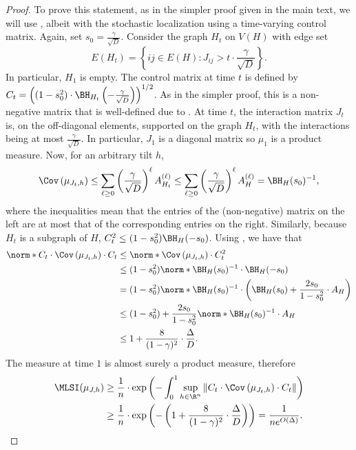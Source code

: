 \documentclass[11pt,letterpaper]{article}
\begin{document}
\begin{proof}
    To prove this statement, as in the simpler proof given in the main text, we will use , albeit with the stochastic localization using a time-varying control matrix. Again, set $s_0 = \frac{\gamma}{\sqrt{D}}$. Consider the graph $H_t$ on $V(H)$ with edge set
    \[ E(H_t) = \left\{ ij \in E(H) : J_{ij} > t \cdot  \frac{\gamma}{\sqrt{D}} \right\}. \]
    In particular, $H_1$ is empty.
    The control matrix at time $t$ is defined by $C_t = \left((1-s_0^2) \cdot \BH_{H_t} \left( - \frac{\gamma}{\sqrt{D}} \right)\right)^{1/2}$. As in the simpler proof, this is a non-negative matrix that is well-defined due to . At time $t$, the interaction matrix $J_t$ is, on the off-diagonal elements, supported on the graph $H_t$, with the interactions being at most $\frac{\gamma}{\sqrt{D}}$. In particular, $J_1$ is a diagonal matrix so $\mu_{1}$ is a product measure. Now, for an arbitrary tilt $h$,
    \[ \Cov\left( \mu_{J_t,h} \right) \le \sum_{\ell \ge 0} \left( \frac{\gamma}{\sqrt{D}} \right)^{\ell} A^{(\ell)}_{H_t} \le \sum_{\ell \ge 0} \left( \frac{\gamma}{\sqrt{D}} \right)^{\ell} A^{(\ell)}_{H} = \BH_{H}(s_0)^{-1}, \]
    where the inequalities mean that the entries of the (non-negative) matrix on the left are at most that of the corresponding entries on the right. Similarly, because $H_t$ is a subgraph of $H$, $C_t^2 \le (1-s_0^2) \BH_H(-s_0)$. Using , we have that
    \begin{align*}
        \norm*{ C_t \cdot \Cov\left( \mu_{J_t,h} \right) \cdot C_t } &\le \norm*{ \Cov\left( \mu_{J_t,h} \right) \cdot C_t^2 } \\
            &\le (1-s_0^2) \norm*{ \BH_{H}(s_0)^{-1} \cdot \BH_{H}(-s_0) } \\
            &= (1-s_0^2) \norm*{ \BH_{H}(s_0)^{-1} \cdot \left(\BH_{H}(s_0) + \frac{2s_0}{1-s_0^2} \cdot A_{H} \right) } \\
            &\le (1-s_0^2) + \frac{2s_0}{1-s_0^2} \norm*{ \BH_{H}(s_0)^{-1} \cdot A_{H} } \\
            &\le 1 + \frac{8}{(1-\gamma)^2} \cdot \frac{\Delta}{D}.
    \end{align*}
    The measure at time $1$ is almost surely a product measure, therefore
    \begin{align*}
        \MLSI(\mu_{J,h}) &\ge \frac{1}{n} \cdot \exp \left( - \int_0^1 \sup_{h \in \R^n} \left\| C_t \cdot \Cov\left( \mu_{J_t,h} \right) \cdot C_t \right\| \right) \\
            &\ge \frac{1}{n} \cdot \exp\left( - \left( 1 + \frac{8}{(1-\gamma)^2} \cdot \frac{\Delta}{D} \right) \right) = \frac{1}{ne^{O(\Delta)}}. \qedhere
    \end{align*}
\end{proof}
\end{document}
